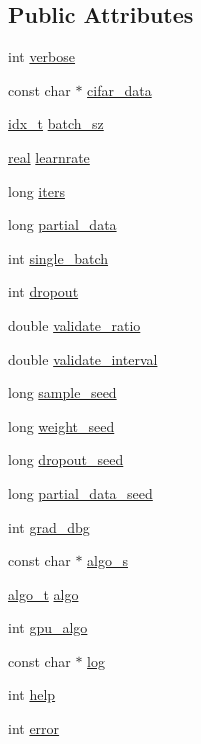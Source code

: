 \subsection*{Public Attributes}
\begin{DoxyCompactItemize}
\item 
int \hyperlink{structcmdline__opt_a2212d80547e3ae3504942006440f7285}{verbose}
\item 
const char $\ast$ \hyperlink{structcmdline__opt_aeaf0e85613dea855a29a691b5915e81a}{cifar\+\_\+data}
\item 
\hyperlink{vgg__util_8h_a8e93478a00e685bea5e6a3f617bf03a3}{idx\+\_\+t} \hyperlink{structcmdline__opt_a417b11f5b6a5213e293ce930a471a786}{batch\+\_\+sz}
\item 
\hyperlink{vgg__util_8h_a1082d08aaa761215ec83e7149f27ad16}{real} \hyperlink{structcmdline__opt_a69793f204ee2703085e3153062f0a3fd}{learnrate}
\item 
long \hyperlink{structcmdline__opt_a430664c4a225528c56f959765371755d}{iters}
\item 
long \hyperlink{structcmdline__opt_a36b99fa5f7fa96a44170687afc327f07}{partial\+\_\+data}
\item 
int \hyperlink{structcmdline__opt_a2e2f53ec465901071633192bfdec032a}{single\+\_\+batch}
\item 
int \hyperlink{structcmdline__opt_a0db00c69f0bfa206b17748c0b9ca1d0b}{dropout}
\item 
double \hyperlink{structcmdline__opt_a559a5437432ab522d6f2749876147029}{validate\+\_\+ratio}
\item 
double \hyperlink{structcmdline__opt_a93fd0f470a52208842dd7257b83df50b}{validate\+\_\+interval}
\item 
long \hyperlink{structcmdline__opt_aa92b1cc0e53246cc03bbab7fbc84b5ae}{sample\+\_\+seed}
\item 
long \hyperlink{structcmdline__opt_a70133aad1b243d44e1be18be81633939}{weight\+\_\+seed}
\item 
long \hyperlink{structcmdline__opt_a8618cfd6b437743f58258b580d59b466}{dropout\+\_\+seed}
\item 
long \hyperlink{structcmdline__opt_a046deb2b2e8e313a27f753cf4aa9883c}{partial\+\_\+data\+\_\+seed}
\item 
int \hyperlink{structcmdline__opt_a5e70c87e86e82f9d42f6eb341f0902e3}{grad\+\_\+dbg}
\item 
const char $\ast$ \hyperlink{structcmdline__opt_aa5b05fde2a12fcab6f9ce0baf3e29d29}{algo\+\_\+s}
\item 
\hyperlink{vgg__util_8h_ae1267137aba8cc25a02220492efa7d3c}{algo\+\_\+t} \hyperlink{structcmdline__opt_a4506cc13417cfb1379411fb497ae3c39}{algo}
\item 
int \hyperlink{structcmdline__opt_acb8b225214983d009415a26f2e45eb65}{gpu\+\_\+algo}
\item 
const char $\ast$ \hyperlink{structcmdline__opt_a0ecd10b9b45fb70719fb85fff85469ad}{log}
\item 
int \hyperlink{structcmdline__opt_afcc6982691bd1f6dfac42dbf423f9ead}{help}
\item 
int \hyperlink{structcmdline__opt_a500dde11d2a0ee2e4dff8e4144083556}{error}
\end{DoxyCompactItemize}


